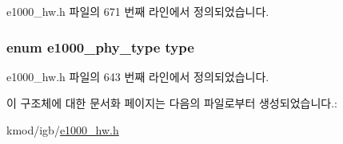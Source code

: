 e1000\+\_\+hw.\+h 파일의 671 번째 라인에서 정의되었습니다.

\subsubsection[{\texorpdfstring{type}{type}}]{\setlength{\rightskip}{0pt plus 5cm}enum {\bf e1000\+\_\+phy\+\_\+type} type}\hypertarget{structe1000__phy__info_aac926af1392edf6d37cc0a5ad3795e1c}{}\label{structe1000__phy__info_aac926af1392edf6d37cc0a5ad3795e1c}


e1000\+\_\+hw.\+h 파일의 643 번째 라인에서 정의되었습니다.



이 구조체에 대한 문서화 페이지는 다음의 파일로부터 생성되었습니다.\+:\begin{DoxyCompactItemize}
\item 
kmod/igb/\hyperlink{kmod_2igb_2e1000__hw_8h}{e1000\+\_\+hw.\+h}\end{DoxyCompactItemize}
